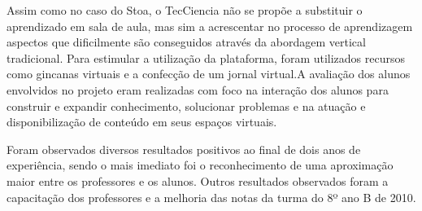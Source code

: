 Assim como no caso do Stoa, o TecCiencia não se propõe a substituir o aprendizado
em sala de aula, mas sim a acrescentar no processo de aprendizagem aspectos que
dificilmente são conseguidos através da abordagem vertical tradicional. Para
estimular a utilização da plataforma, foram utilizados recursos como gincanas
virtuais e a confecção de um jornal virtual.A avaliação dos alunos envolvidos no
projeto eram realizadas com foco na interação dos alunos para construir e expandir
conhecimento, solucionar problemas e na atuação e disponibilização de conteúdo
em seus espaços virtuais.

Foram observados diversos resultados positivos ao final de dois anos de experiência,
sendo o mais imediato foi o reconhecimento de uma aproximação maior entre os professores
e os alunos. Outros resultados observados foram a capacitação dos professores
e a melhoria das notas da turma do 8º ano B de 2010. 



\begin{comment}
A perspectiva do ambiente está na aprendizagem, na construção do
conhecimento, na colaboração, na cooperação entre os agentes do conhecimento, alunos
e professores, na autonomia e no desenvolvimento de competências e habilidades
previamente estabelecidas na matriz de competências delineada pelo corpo docente da
escola. Com isto, o aluno passa a ser visto como agente do seu processo de
aprendizagem, sujeito com conhecimentos prévios, pesquisador, participativo,
cooperativo e crítico. Nesta perspectiva, o professor é visto como mediador,
coparticipante, explorador, mobilizador de sua comunidade, facilitador,
problematizador, orientador, articulador do processo de aprendizagem.

Neste ambiente, as comunidades são espaços agregadores de ideias, de pessoas,
de conteúdos, que são criadas pelos usuários com objetivos diversos, e podem ser
construídas como um blog ou como uma reunião de artigos diversos e cuja
representação virtual oferece várias outras oportunidades de agregar recursos adequados
à aprendizagem, como os espaços laterais da homepage que oferecem frames onde se
pode agregar conteúdos livres ou utilizar o padrão inicial oferecido pelo ambiente, que
poderá ser customizado à medida que a comunidade vai sendo construída, o que
proporciona um dinamismo natural.

\end{comment}


\begin{comment}
{silva2006}
A prática pedagógica coerente com a sociedade atual implica no uso constante
de ferramentas digitais e na educação em rede, que segundo Silva (2006), tem grande
potencial para propiciar a “quebra da verticalização” da relação professor/aluno. A
dinâmica da interface online permitem ao professor superar a prevalência da pedagogia
da transmissão.
\end{comment}
